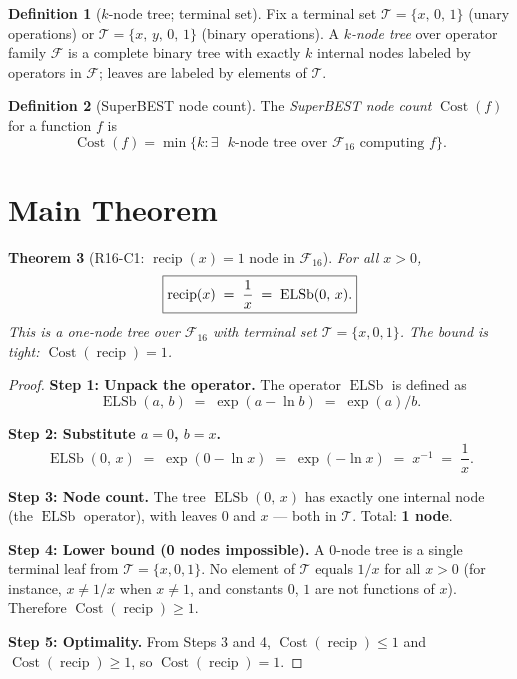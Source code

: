\documentclass[12pt,a4paper]{article}
\newtheorem{theorem}{Theorem}[section]
\theoremstyle{definition}
\newtheorem{definition}[theorem]{Definition}
\newcommand{\ELSb}{\operatorname{ELSb}}
\newcommand{\recip}{\operatorname{recip}}
\newcommand{\Cost}{\operatorname{Cost}}
\begin{document}
\begin{definition}[$k$-node tree; terminal set]
\label{def:tree}
Fix a terminal set $\mathcal{T} = \{x,\,0,\,1\}$ (unary operations)
or $\mathcal{T} = \{x,\,y,\,0,\,1\}$ (binary operations).
A \emph{$k$-node tree} over operator family $\mathcal{F}$ is a complete
binary tree with exactly $k$ internal nodes labeled by operators in
$\mathcal{F}$; leaves are labeled by elements of $\mathcal{T}$.
\end{definition}

\begin{definition}[SuperBEST node count]
The \emph{SuperBEST node count} $\Cost(f)$ for a function $f$ is
\[
  \Cost(f) = \min\{k : \exists\text{ $k$-node tree over }\mathcal{F}_{16}
             \text{ computing }f\}.
\]
\end{definition}

\section{Main Theorem}

\begin{theorem}[R16-C1: $\recip(x) = 1$ node in $\mathcal{F}_{16}$]
\label{thm:main}
For all $x > 0$,
\[
  \boxed{%
    \recip(x) \;=\; \frac{1}{x} \;=\; \ELSb(0,\,x).
  }
\]
This is a \emph{one-node} tree over $\mathcal{F}_{16}$ with terminal set
$\mathcal{T} = \{x, 0, 1\}$.
The bound is tight: $\Cost(\recip) = 1$.
\end{theorem}

\begin{proof}
\textbf{Step 1: Unpack the operator.}
The operator $\ELSb$ is defined as
\[
  \ELSb(a,\,b) \;=\; \exp(a - \ln b) \;=\; \exp(a) / b.
\]

\textbf{Step 2: Substitute $a = 0$, $b = x$.}
\[
  \ELSb(0,\,x)
  \;=\; \exp(0 - \ln x)
  \;=\; \exp(-\ln x)
  \;=\; x^{-1}
  \;=\; \frac{1}{x}.
\]

\textbf{Step 3: Node count.}
The tree $\ELSb(0,\,x)$ has exactly one internal node (the $\ELSb$
operator), with leaves $0$ and $x$ — both in $\mathcal{T}$.
Total: \textbf{1 node}.

\textbf{Step 4: Lower bound (0 nodes impossible).}
A 0-node tree is a single terminal leaf from $\mathcal{T} = \{x, 0, 1\}$.
No element of $\mathcal{T}$ equals $1/x$ for all $x > 0$ (for instance,
$x \neq 1/x$ when $x \neq 1$, and constants $0$, $1$ are not functions of $x$).
Therefore $\Cost(\recip) \geq 1$.

\textbf{Step 5: Optimality.}
From Steps 3 and 4, $\Cost(\recip) \leq 1$ and $\Cost(\recip) \geq 1$,
so $\Cost(\recip) = 1$.
\end{proof}
\end{document}
